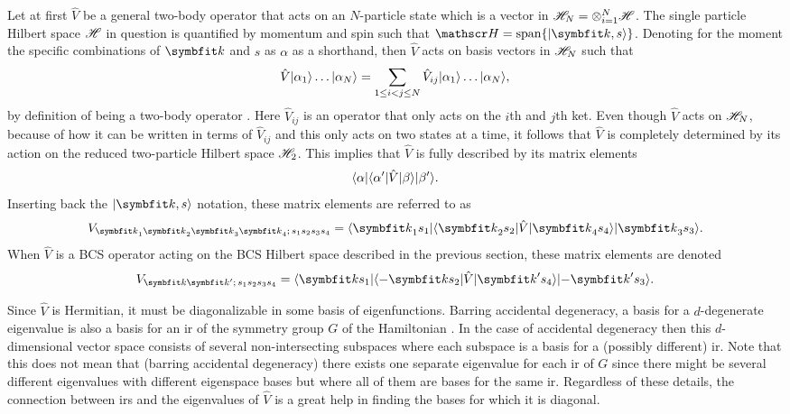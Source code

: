 Let at first $\hat{V}$ be a general two-body operator that acts on an $N$-particle state which is a vector in $\mathscr{H}_N = \otimes_{i=1}^N\mathscr{H}$. The
single particle Hilbert space $\mathscr{H}$ in question is quantified by momentum and spin such that $\hil=\Span\{\ket{\v{k},s}\}$. Denoting for the moment
the specific combinations of $\v{k}$ and $s$ as $\alpha$ as a shorthand, then $\hat{V}$ acts on basis vectors in $\mathscr{H}_N$ such that
\begin{equation}
    \label{eq:Group:Potential:twoBodyInteraction}
    \hat{V}\lvert \alpha_1 \rangle\ldots\lvert \alpha_N \rangle = \sum_{1\leq i<j\leq N}\hat{V}_{ij}\lvert \alpha_1 \rangle\ldots\lvert \alpha_N \rangle,
\end{equation}
by definition of being a two-body operator \cite{NegeleOrland98}. Here $\hat{V}_{ij}$ is an operator that only acts on the $i$th and $j$th ket. Even though $\hat{V}$ acts on
$\mathscr{H}_N$, because of how it can be written in terms of $\hat{V}_{ij}$ and this only acts on two states at a time, it follows that $\hat{V}$ is
completely determined by its action on the reduced two-particle Hilbert space $\mathscr{H}_2$. This implies that $\hat{V}$ is fully described by its matrix elements
\begin{equation}
    \label{eq:Group:Potential:genTwoBodyMatrixElem}
    \langle \alpha \rvert\langle \alpha' \rvert\hat{V}\lvert \beta \rangle\lvert \beta' \rangle.
\end{equation}
Inserting back the $\ket{\v{k},s}$ notation, these matrix elements are referred to as
\begin{equation}
    \label{eq:Group:Potential:momSpinPotentialMatrixElems}
    V_{\v{k}_1\v{k}_2\v{k}_3\v{k}_4;\,s_1s_2s_3s_4} = \bra{\v{k}_1s_1}\bra{\v{k}_2s_2}\hat{V}\ket{\v{k}_4s_4}\ket{\v{k}_3s_3}.
\end{equation}
When $\hat{V}$ is a BCS operator acting on the BCS Hilbert space described in the previous section, these matrix elements are denoted
\begin{equation}
    \label{eq:Group:Potential:bcsTwoBodyMatrixElem}
    V_{\v{k}\v{k}';\,s_1s_2s_3s_4} = \bra{\v{k}s_1}\bra{-\v{k}s_2}\hat{V}\ket{\v{k}'s_4}\ket{-\v{k}'s_3}.
\end{equation}

Since $\hat{V}$ is Hermitian, it must be diagonalizable in some basis of eigenfunctions. Barring accidental degeneracy, a basis for a $d$-degenerate
eigenvalue is also a basis for an \ac{ir} of the symmetry group $G$ of the Hamiltonian \cite{Inui90}. In the case of accidental degeneracy
then this $d$-dimensional vector space consists of several non-intersecting subspaces where each subspace is a basis for a (possibly different) \ac{ir}. Note
that this does not mean that (barring accidental degeneracy) there exists one separate eigenvalue for each \ac{ir} of $G$ since there might be
several different eigenvalues with different eigenspace bases but where all of them are bases for the same \ac{ir}. Regardless of these details,
the connection between \ac{ir}s and the eigenvalues of $\hat{V}$ is a great help in finding the bases for which it is
diagonal.

